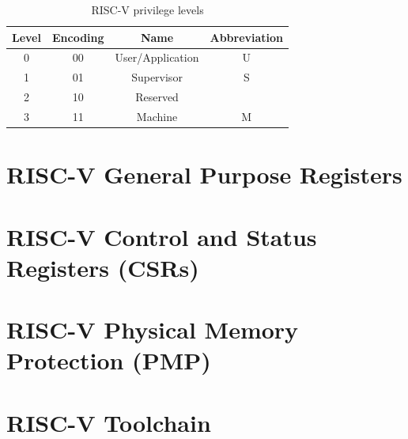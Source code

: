 \begin{table}
  \centering
  \begin{tabular}{|c|c|c|c|}
    \hline
    \textbf{Level} & \textbf{Encoding} & \textbf{Name}    & \textbf{Abbreviation} \\
    \hline
    0              & 00                & User/Application & U                     \\
    \hline
    1              & 01                & Supervisor       & S                     \\
    \hline
    2              & 10                & Reserved         &                       \\
    \hline
    3              & 11                & Machine          & M                     \\
    \hline
  \end{tabular}
  \caption{RISC-V privilege levels}
  \label{tab:priv}
\end{table}

\section{RISC-V General Purpose Registers}
\label{sec:riscv_reg}

\lipsum[1]

\section{RISC-V Control and Status Registers (CSRs)}
\label{sec:riscv_csrs}

\lipsum[1]

\section{RISC-V Physical Memory Protection (PMP)}
\label{sec:riscv_pmp}

\lipsum[1]

\section{RISC-V Toolchain}
\label{sec:riscv_toolchain}

\lipsum[1]



